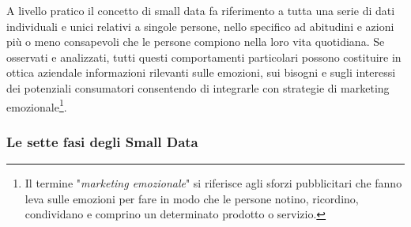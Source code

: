 A livello pratico il concetto di small data fa riferimento a tutta una serie di dati individuali e unici relativi a singole persone, nello specifico ad abitudini e azioni più o meno consapevoli che le persone compiono nella loro vita quotidiana. Se osservati e analizzati, tutti questi comportamenti particolari possono costituire in ottica aziendale informazioni rilevanti sulle emozioni, sui bisogni e sugli interessi dei potenziali consumatori consentendo di integrarle con strategie di marketing emozionale\footnote{Il termine "\textit{marketing emozionale}" si riferisce agli sforzi pubblicitari che fanno leva sulle emozioni per fare in modo che le persone notino, ricordino, condividano e comprino un determinato prodotto o servizio.\cite{oberlo_marketing_emozionale}}.\cite{italiaonline_small_data}

\subsubsection{Le sette fasi degli Small Data}

